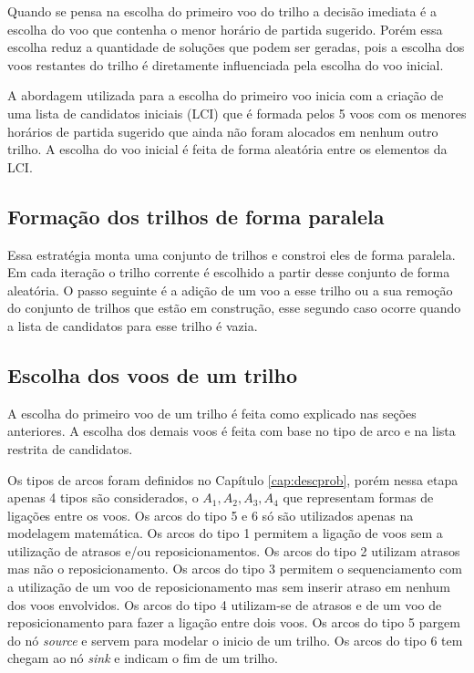 Quando se pensa na escolha do primeiro voo do trilho a decisão imediata é a
escolha do voo que contenha o menor horário de partida sugerido. Porém essa
escolha reduz a quantidade de soluções que podem ser geradas, pois a escolha
dos voos restantes do trilho é diretamente influenciada pela escolha do voo
inicial.

A abordagem utilizada para a escolha do primeiro voo inicia com a criação de
uma lista de candidatos iniciais (LCI) que é formada pelos 5 voos com os menores
horários de partida sugerido que ainda não foram alocados em nenhum outro
trilho. A escolha do voo inicial é feita de forma aleatória entre os elementos da LCI.


\subsection{Formação dos trilhos de forma paralela}
  
  Essa estratégia monta uma conjunto de trilhos e constroi eles de forma paralela. Em cada iteração o trilho corrente é escolhido a partir desse conjunto de forma aleatória. O passo seguinte é a adição de um voo a esse trilho ou a sua remoção do conjunto de trilhos que estão em construção, esse segundo caso ocorre quando a lista de candidatos para esse trilho é vazia.
  
\subsection{Escolha dos voos de um trilho}

 A escolha do primeiro voo de um trilho é feita como explicado nas seções anteriores. A escolha dos demais voos é feita com base no tipo de arco e na lista restrita de candidatos. 
 
 Os tipos de arcos foram definidos no Capítulo \ref{cap:descprob}, porém nessa etapa apenas 4 tipos são considerados, o   $A_{1},A_{2},A_{3},A_{4}$ que representam formas de ligações entre os voos. Os arcos do tipo 5 e 6 só são utilizados apenas na modelagem matemática. Os arcos do tipo 1 permitem a ligação de voos sem a utilização de atrasos e/ou reposicionamentos. Os arcos do tipo 2 utilizam atrasos mas não o reposicionamento. Os arcos do tipo 3 permitem o sequenciamento com a utilização de um voo de reposicionamento mas sem inserir atraso em nenhum dos voos envolvidos. Os arcos do tipo 4 utilizam-se de atrasos e de um voo de reposicionamento para fazer a ligação entre dois voos. Os arcos do tipo 5 pargem do nó \textit{source} e servem para modelar o inicio de um trilho. Os arcos do tipo 6 tem chegam ao nó \textit{sink} e indicam o fim de um trilho.
 
